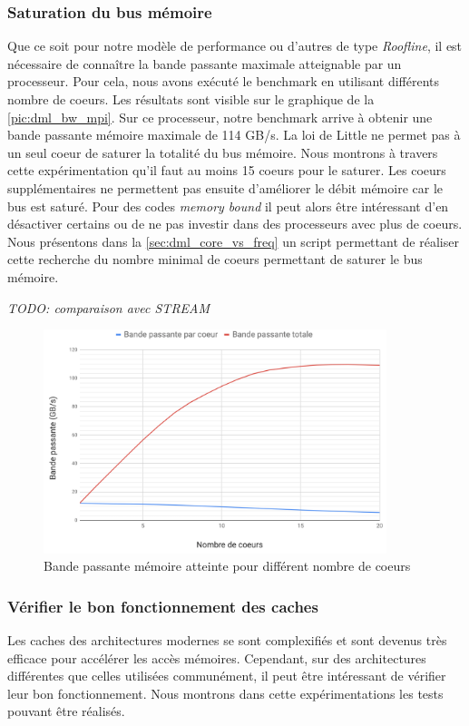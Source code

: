     \subsubsection{Saturation du bus mémoire}\label{sec:dml_saturation}
        Que ce soit pour notre modèle de performance ou d'autres de type \textit{Roofline}, il est nécessaire de connaître la bande passante maximale atteignable par un processeur. Pour cela, nous avons exécuté le benchmark en utilisant différents nombre de coeurs. Les résultats sont visible sur le graphique de la \autoref{pic:dml_bw_mpi}. Sur ce processeur, notre benchmark arrive à obtenir une bande passante mémoire maximale de 114 GB/s. La loi de Little ne permet pas à un seul coeur de saturer la totalité du bus mémoire. Nous montrons à travers cette expérimentation qu'il faut au moins 15 coeurs pour le saturer. Les coeurs supplémentaires ne permettent pas ensuite d'améliorer le débit mémoire car le bus est saturé. Pour des codes \textit{memory bound} il peut alors être intéressant d'en désactiver certains ou de ne pas investir dans des processeurs avec plus de coeurs. Nous présentons dans la \autoref{sec:dml_core_vs_freq} un script permettant de réaliser cette recherche du nombre minimal de coeurs permettant de saturer le bus mémoire. 
        
        \textit{TODO: comparaison avec STREAM}
        
        \begin{figure}
        \center
        \includegraphics[width=10cm]{images/dml_bw_mpi.png}
        \caption{\label{pic:dml_bw_mpi} Bande passante mémoire atteinte pour différent nombre de coeurs}
        \end{figure}
        
    
    
    

    \subsubsection{Vérifier le bon fonctionnement des caches} \label{sec:dml_cache_ok}
        Les caches des architectures modernes se sont complexifiés et sont devenus très efficace pour accélérer les accès mémoires. Cependant, sur des architectures différentes que celles utilisées communément, il peut être intéressant de vérifier leur bon fonctionnement. Nous montrons dans cette expérimentations les tests pouvant être réalisés.
        
